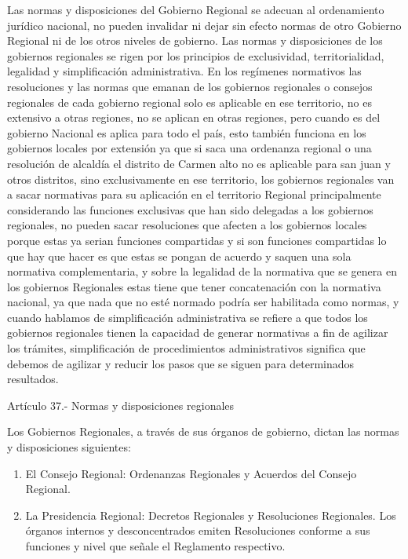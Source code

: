\documentclass[
  a4paper,
]{article}
\providecommand{\tightlist}{%
  \setlength{\itemsep}{0pt}\setlength{\parskip}{0pt}}\usepackage{longtable,booktabs,array}
\begin{document}
Las normas y disposiciones del Gobierno Regional se adecuan al
ordenamiento jurídico nacional, no pueden invalidar ni dejar sin efecto
normas de otro Gobierno Regional ni de los otros niveles de gobierno.
Las normas y disposiciones de los gobiernos regionales se rigen por los
principios de exclusividad, territorialidad, legalidad y simplificación
administrativa. En los regímenes normativos las resoluciones y las
normas que emanan de los gobiernos regionales o consejos regionales de
cada gobierno regional solo es aplicable en ese territorio, no es
extensivo a otras regiones, no se aplican en otras regiones, pero cuando
es del gobierno Nacional es aplica para todo el país, esto también
funciona en los gobiernos locales por extensión ya que si saca una
ordenanza regional o una resolución de alcaldía el distrito de Carmen
alto no es aplicable para san juan y otros distritos, sino
exclusivamente en ese territorio, los gobiernos regionales van a sacar
normativas para su aplicación en el territorio Regional principalmente
considerando las funciones exclusivas que han sido delegadas a los
gobiernos regionales, no pueden sacar resoluciones que afecten a los
gobiernos locales porque estas ya serian funciones compartidas y si son
funciones compartidas lo que hay que hacer es que estas se pongan de
acuerdo y saquen una sola normativa complementaria, y sobre la legalidad
de la normativa que se genera en los gobiernos Regionales estas tiene
que tener concatenación con la normativa nacional, ya que nada que no
esté normado podría ser habilitada como normas, y cuando hablamos de
simplificación administrativa se refiere a que todos los gobiernos
regionales tienen la capacidad de generar normativas a fin de agilizar
los trámites, simplificación de procedimientos administrativos significa
que debemos de agilizar y reducir los pasos que se siguen para
determinados resultados.

Artículo 37.- Normas y disposiciones regionales

Los Gobiernos Regionales, a través de sus órganos de gobierno, dictan
las normas y disposiciones siguientes:

\begin{enumerate}
\def\labelenumi{\alph{enumi})}
\tightlist
\item
  El Consejo Regional: Ordenanzas Regionales y Acuerdos del Consejo
  Regional.
\item
  La Presidencia Regional: Decretos Regionales y Resoluciones
  Regionales. Los órganos internos y desconcentrados emiten Resoluciones
  conforme a sus funciones y nivel que señale el Reglamento respectivo.
\end{enumerate}
\end{document}
